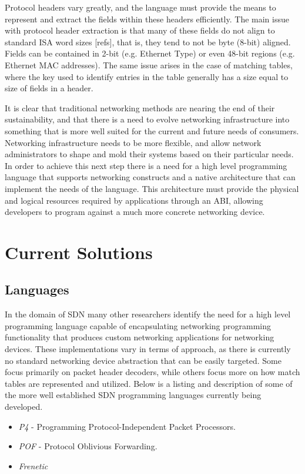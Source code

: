 Protocol headers vary greatly, and the language must provide the means to 
represent and extract the fields within these headers efficiently. The main 
issue with protocol header extraction is that many of these fields do not 
align to standard ISA word sizes [refs], that is, they tend to not be byte 
(8-bit) aligned. Fields can be contained in 2-bit (e.g. Ethernet Type) or even 
48-bit regions (e.g. Ethernet MAC addresses). The same issue arises in the case
of matching tables, where the key used to identify entries in the table 
generally has a size equal to size of fields in a header.

It is clear that traditional networking methods are nearing the end of their
sustainability, and that there is a need to evolve networking infrastructure
into something that is more well suited for the current and future needs of
consumers. Networking infrastructure needs to be more flexible, and allow 
network administrators to shape and mold their systems based on their
particular needs. In order to achieve this next step there is a need for a
high level programming language that supports networking constructs and
a native architecture that can implement the needs of the language. This
architecture must provide the physical and logical resources required by
applications through an ABI, allowing developers to program against a much
more concrete networking device.

\section{Current Solutions}

\subsection{Languages}
In the domain of SDN many other researchers identify the need for a high level
programming language capable of encapsulating networking programming 
functionality that produces custom networking applications for networking 
devices. These implementations vary in terms of approach, as there is currently
no standard networking device abstraction that can be easily targeted. Some 
focus primarily on packet header decoders, while others focus more on how match
tables are represented and utilized. Below is a listing and description of 
some of the more well established SDN programming languages currently being
developed.
\begin{itemize}
\item \emph{P4} - Programming Protocol-Independent Packet Processors.
\item \emph{POF} - Protocol Oblivious Forwarding.
\item \emph{Frenetic}
\end{itemize}

